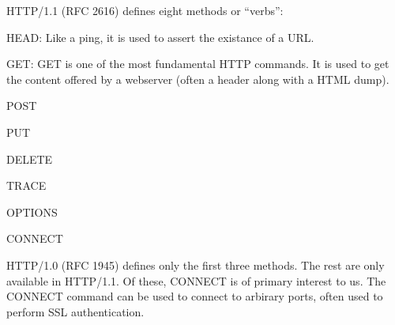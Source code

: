 HTTP/1.1 (RFC 2616) defines eight methods or ``verbs'':
\begin{innerlist}
\item HEAD: Like a ping, it is used to assert the existance of a URL.
\item GET: GET is one of the most fundamental HTTP commands. It is used to get the content offered by a webserver (often a header along with a HTML dump).
\item POST
\item PUT
\item DELETE
\item TRACE
\item OPTIONS
\item CONNECT
\end{innerlist}

HTTP/1.0 (RFC 1945) defines only the first three methods. The rest are only available in HTTP/1.1. Of these, CONNECT is of primary interest to us. The CONNECT command can be used to connect to arbirary ports, often used to perform SSL authentication.
